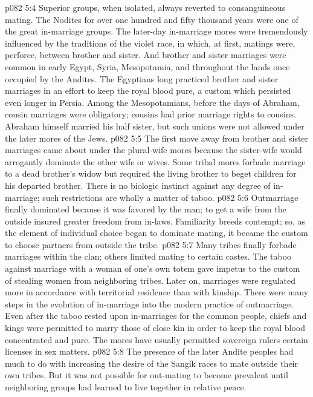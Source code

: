 \pc \vs p082 5:4 Superior groups, when isolated, always reverted to consanguineous mating. The Nodites for over one hundred and fifty thousand years were one of the great in\hyp{}marriage groups. The later\hyp{}day in\hyp{}marriage mores were tremendously influenced by the traditions of the violet race, in which, at first, matings were, perforce, between brother and sister. And brother and sister marriages were common in early Egypt, Syria, Mesopotamia, and throughout the lands once occupied by the Andites. The Egyptians long practiced brother and sister marriages in an effort to keep the royal blood pure, a custom which persisted even longer in Persia. Among the Mesopotamians, before the days of Abraham, cousin marriages were obligatory; cousins had prior marriage rights to cousins. Abraham himself married his half sister, but such unions were not allowed under the later mores of the Jews.
\vs p082 5:5 The first move away from brother and sister marriages came about under the plural\hyp{}wife mores because the sister\hyp{}wife would arrogantly dominate the other wife or wives. Some tribal mores forbade marriage to a dead brother’s widow but required the living brother to beget children for his departed brother. There is no biologic instinct against any degree of in\hyp{}marriage; such restrictions are wholly a matter of taboo.
\pc \vs p082 5:6 Outmarriage finally dominated because it was favored by the man; to get a wife from the outside insured greater freedom from in\hyp{}laws. Familiarity breeds contempt; so, as the element of individual choice began to dominate mating, it became the custom to choose partners from outside the tribe.
\vs p082 5:7 Many tribes finally forbade marriages within the clan; others limited mating to certain castes. The taboo against marriage with a woman of one’s own totem gave impetus to the custom of stealing women from neighboring tribes. Later on, marriages were regulated more in accordance with territorial residence than with kinship. There were many steps in the evolution of in\hyp{}marriage into the modern practice of outmarriage. Even after the taboo rested upon in\hyp{}marriages for the common people, chiefs and kings were permitted to marry those of close kin in order to keep the royal blood concentrated and pure. The mores have usually permitted sovereign rulers certain licenses in sex matters.
\vs p082 5:8 The presence of the later Andite peoples had much to do with increasing the desire of the Sangik races to mate outside their own tribes. But it was not possible for out\hyp{}mating to become prevalent until neighboring groups had learned to live together in relative peace.
